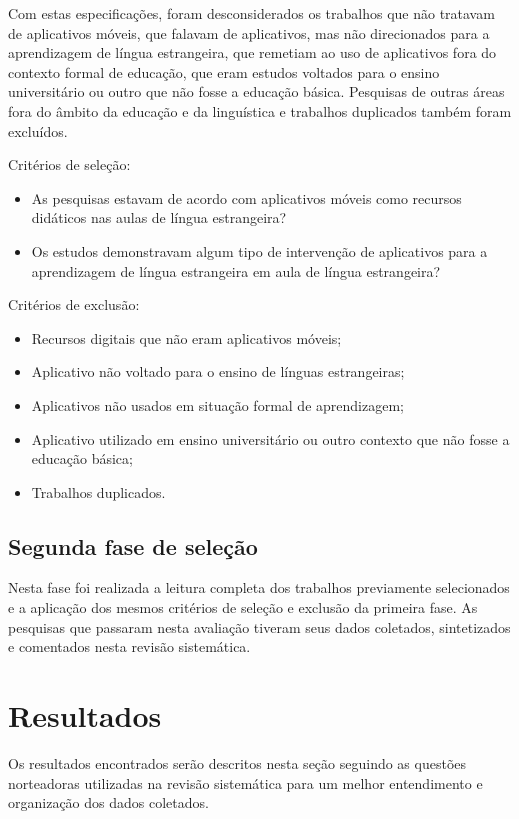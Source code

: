 \documentclass{textolivre}
\begin{document}
Com estas especificações, foram desconsiderados os trabalhos que não tratavam de aplicativos móveis, que falavam de aplicativos, mas não direcionados para a aprendizagem de língua estrangeira, que remetiam ao uso de aplicativos fora do contexto formal de educação, que eram estudos voltados para o ensino universitário ou outro que não fosse a educação básica. Pesquisas de outras áreas fora do âmbito da educação e da linguística e trabalhos duplicados também foram excluídos.

Critérios de seleção:
\begin{itemize}
\item As pesquisas estavam de acordo com aplicativos móveis como recursos didáticos nas aulas de língua estrangeira?
\item Os estudos demonstravam algum tipo de intervenção de aplicativos para a aprendizagem de língua estrangeira em aula de língua estrangeira?
\end{itemize}

Critérios de exclusão:
\begin{itemize}
\item Recursos digitais que não eram aplicativos móveis;
\item Aplicativo não voltado para o ensino de línguas estrangeiras;
\item Aplicativos não usados em situação formal de aprendizagem;
\item Aplicativo utilizado em ensino universitário ou outro contexto que não fosse a educação básica;
\item Trabalhos duplicados.
\end{itemize}

\subsection{Segunda fase de seleção}
Nesta fase foi realizada a leitura completa dos trabalhos previamente selecionados e a aplicação dos mesmos critérios de seleção e exclusão da primeira fase. As pesquisas que passaram nesta avaliação tiveram seus dados coletados, sintetizados e comentados nesta revisão sistemática. 

\section{Resultados}
Os resultados encontrados serão descritos nesta seção seguindo as questões norteadoras utilizadas na revisão sistemática para um melhor entendimento e organização dos dados coletados. 
\end{document}
